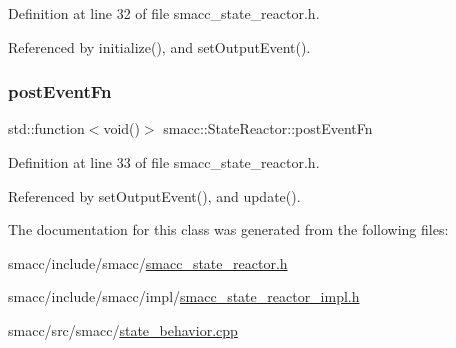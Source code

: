 Definition at line 32 of file smacc\+\_\+state\+\_\+reactor.\+h.



Referenced by initialize(), and set\+Output\+Event().

\mbox{\label{classsmacc_1_1StateReactor_a1d97ae5c1689b6716c60c19c94a7eeae}} 
\subsubsection{\texorpdfstring{post\+Event\+Fn}{postEventFn}}
{\footnotesize\ttfamily std\+::function$<$void()$>$ smacc\+::\+State\+Reactor\+::post\+Event\+Fn}



Definition at line 33 of file smacc\+\_\+state\+\_\+reactor.\+h.



Referenced by set\+Output\+Event(), and update().



The documentation for this class was generated from the following files\+:\begin{DoxyCompactItemize}
\item 
smacc/include/smacc/\hyperlink{smacc__state__reactor_8h}{smacc\+\_\+state\+\_\+reactor.\+h}\item 
smacc/include/smacc/impl/\hyperlink{smacc__state__reactor__impl_8h}{smacc\+\_\+state\+\_\+reactor\+\_\+impl.\+h}\item 
smacc/src/smacc/\hyperlink{state__behavior_8cpp}{state\+\_\+behavior.\+cpp}\end{DoxyCompactItemize}
